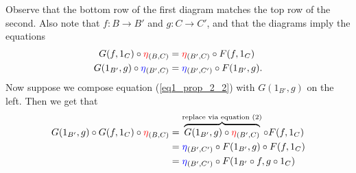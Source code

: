 \begin{prf}
\begin{description}
            \begin{center}
                \hspace{1cm}
            \end{center}
            Observe that
            the bottom row of the first diagram matches the top row of
            the second. 
            Also note that $f: B \to B'$ and $g: C \to C'$, and that the
            diagrams imply the equations 
            \begin{align}
                G(f, 1_C) \circ \textcolor{red}{\eta}_{(B,C)} &= \textcolor{red}{\eta}_{(B', C)} \circ F(f, 1_C) \label{eq1_prop_2_2}\\
                G(1_{B'}, g) \circ \textcolor{blue}{\eta}_{(B', C)} &= \textcolor{blue}{\eta}_{(B', C')} \circ F(1_{B'}, g). \label{eq2_prop_2_2}
            \end{align}
            Now suppose we compose equation (\ref{eq1_prop_2_2}) with
            $G(1_{B'}, g)$ on the left. Then we get that 
            \begin{align*}
                G(1_{B'}, g)\circ G(f, 1_C) \circ \textcolor{red}{\eta}_{(B, C)} &= \overbrace{G(1_{B'}, g) \circ \textcolor{red}{\eta}_{(B', C)}}^{\text{replace via equation (2)}} \circ F(f, 1_C)\\
                &= \textcolor{blue}{\eta}_{(B', C')} \circ F(1_{B'}, g) \circ F(f, 1_C)\\
                &= \textcolor{blue}{\eta}_{(B',C')} \circ F(1_{B'}\circ f, g \circ 1_C)\\

\end{align*}
\end{description}
\end{prf}
